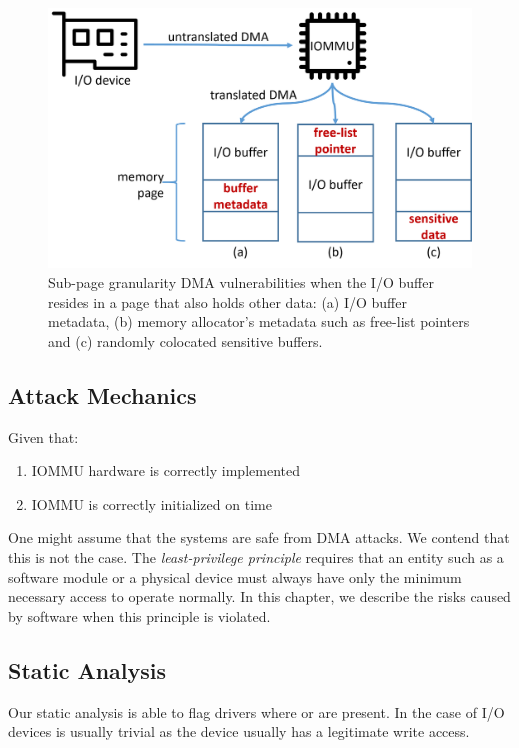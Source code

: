 \begin{figure}[t]
    \centering
    \includegraphics[width=1\columnwidth]{figs/colocation.png}
    \caption{Sub-page granularity DMA vulnerabilities when the I/O buffer resides in
a page that also holds other data: (a) I/O buffer metadata, (b) memory allocator’s
metadata such as free-list pointers and (c) randomly colocated sensitive buffers.}
    \label{fig:colocation}
\end{figure}
\subsection{Attack Mechanics}
Given that:
\begin{enumerate}
    \item IOMMU hardware is correctly implemented 
    \item IOMMU is correctly initialized on time
\end{enumerate}
One might assume that the systems are safe from DMA attacks. We contend that this is not the case. The \textit{least-privilege principle} requires that an entity such as a software module or a physical device must always have only the minimum necessary access to operate normally. In this chapter, we describe the risks caused by software when this principle is violated.

\subsection{Static Analysis}
Our static analysis is able to flag drivers where \means{} or \oportunity{} are present. In the case of I/O devices \motivation{} is usually trivial as the device usually has a legitimate write access. 

